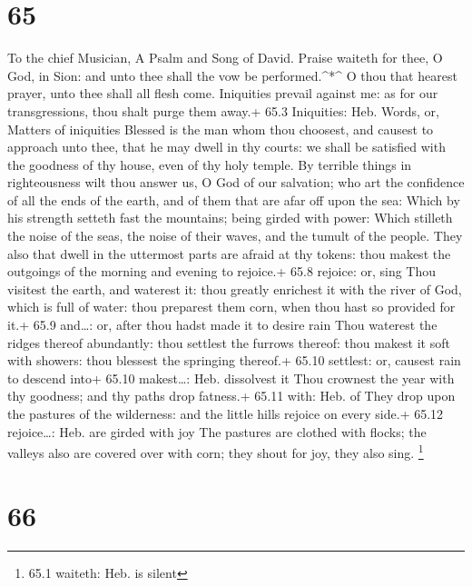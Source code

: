 \hypertarget{section-64}{%
\section{65}\label{section-64}}

To the chief Musician, A Psalm and Song of David.  Praise
waiteth for thee, O God, in Sion: and unto thee shall the vow be
performed.\^{}*\^{}  O thou that hearest prayer, unto thee
shall all flesh come.  Iniquities prevail against me: as for
our transgressions, thou shalt purge them away.+ 65.3 Iniquities: Heb.
Words, or, Matters of iniquities  Blessed is the man whom
thou choosest, and causest to approach unto thee, that he may dwell in
thy courts: we shall be satisfied with the goodness of thy house, even
of thy holy temple.  By terrible things in righteousness
wilt thou answer us, O God of our salvation; who art the confidence of
all the ends of the earth, and of them that are afar off upon the sea:
 Which by his strength setteth fast the mountains; being
girded with power:  Which stilleth the noise of the seas,
the noise of their waves, and the tumult of the people. 
They also that dwell in the uttermost parts are afraid at thy tokens:
thou makest the outgoings of the morning and evening to rejoice.+ 65.8
rejoice: or, sing  Thou visitest the earth, and waterest it:
thou greatly enrichest it with the river of God, which is full of water:
thou preparest them corn, when thou hast so provided for it.+ 65.9
and\ldots: or, after thou hadst made it to desire rain 
Thou waterest the ridges thereof abundantly: thou settlest the furrows
thereof: thou makest it soft with showers: thou blessest the springing
thereof.+ 65.10 settlest: or, causest rain to descend into+ 65.10
makest\ldots: Heb. dissolvest it  Thou crownest the year
with thy goodness; and thy paths drop fatness.+ 65.11 with: Heb. of
 They drop upon the pastures of the wilderness: and the
little hills rejoice on every side.+ 65.12 rejoice\ldots: Heb. are
girded with joy  The pastures are clothed with flocks; the
valleys also are covered over with corn; they shout for joy, they also
sing. \footnote{65.1 waiteth: Heb. is silent}

\hypertarget{section-65}{%
\section{66}\label{section-65}}

